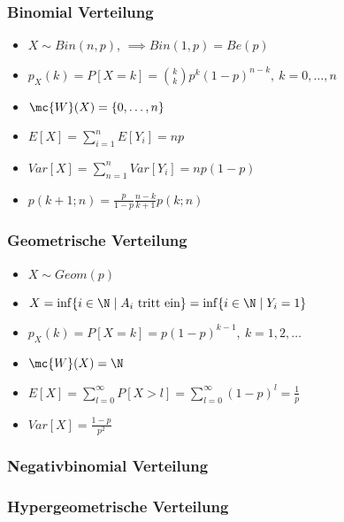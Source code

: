 \subsubsection{Binomial Verteilung}
\begin{itemize}
    \item $X \sim Bin(n, p)$, $\implies Bin(1, p) = Be(p)$
    \item $p_X(k) = P[X = k] = {k\choose k} p^k (1 - p)^{n - k}, \ k = 0, \dots, n$
    \item $\mc{W}(X) = \{0, \dots, n\}$
    \item $E[X] = \sum_{i=1}^{n} E[Y_i] = np$
    \item $Var[X] = \sum_{n=1}^{n} Var[Y_i] = np(1 - p)$
    \item $p(k + 1; n) = \frac{p}{1 - p}\frac{n - k}{k + 1} p(k; n)$
\end{itemize}

\subsubsection{Geometrische Verteilung}
\begin{itemize}
    \item $X \sim Geom(p)$
    \item $X = \inf \{i \in \N \mid A_i \text{ tritt ein}\} = \inf \{i \in \N \mid Y_i = 1\}$
    \item $p_X(k) = P[X = k] = p(1 - p)^{k - 1}, \ k = 1, 2, \dots$
    \item $\mc{W}(X) = \N$
    \item $E[X] = \sum_{l=0}^{\infty} P[X > l] = \sum_{l=0}^{\infty} (1 - p)^l = \frac{1}{p}$
    \item $Var[X] = \frac{1 - p}{p^2}$
\end{itemize}

\subsubsection{Negativbinomial Verteilung}

\subsubsection{Hypergeometrische Verteilung}

